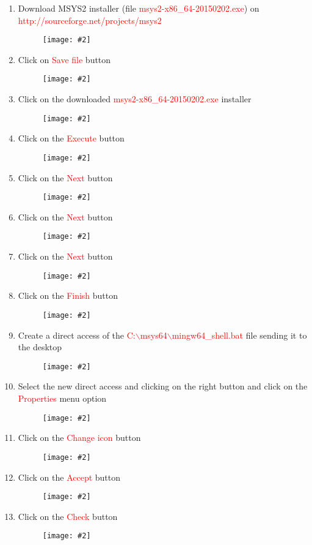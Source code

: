 \documentclass[a4paper]{article}
\newcommand{\FIG}[2]
{
	\begin{figure}[ht!]
	\centering
	\texttt{[image: \#2]}
	\end{figure}
}
\newcommand{\FIGURE}[1]{\FIG{0.35}{#1}}
\newcommand{\RED}[1] {\textcolor{red}{#1}}
\begin{document}
\begin{enumerate}

\item Download MSYS2 installer (file \RED{msys2-x86\_64-20150202.exe}) on
\newline\RED{http://sourceforge.net/projects/msys2}

\FIGURE{MSYS2-1.png.eps}

\item Click on \RED{Save file} button
\FIGURE{MSYS2-2.png.eps}

\clearpage

\item Click on the downloaded \RED{msys2-x86\_64-20150202.exe} installer
\FIGURE{MSYS2-3.png.eps}

\item Click on the \RED{Execute} button
\FIGURE{MSYS2-4.png.eps}

\clearpage

\item Click on the \RED{Next} button
\FIGURE{MSYS2-5.png.eps}

\item Click on the \RED{Next} button
\FIGURE{MSYS2-6.png.eps}

\clearpage

\item Click on the \RED{Next} button
\FIGURE{MSYS2-7.png.eps}

\item Click on the \RED{Finish} button
\FIGURE{MSYS2-8.png.eps}

\clearpage

\item Create a direct access of the
\RED{C:$\backslash$msys64$\backslash$mingw64\_shell.bat} file sending it to the
desktop
\FIGURE{MSYS2-10.png.eps}

\item Select the new direct access and clicking on the right button and click on
the \RED{Properties} menu option
\FIGURE{MSYS2-12.png.eps}

\clearpage

\item Click on the \RED{Change icon} button
\FIGURE{MSYS2-13.png.eps}

\item Click on the \RED{Accept} button
\FIGURE{MSYS2-14.png.eps}

\clearpage

\item Click on the \RED{Check} button
\FIGURE{MSYS2-15.png.eps}


\end{enumerate}
\end{document}
